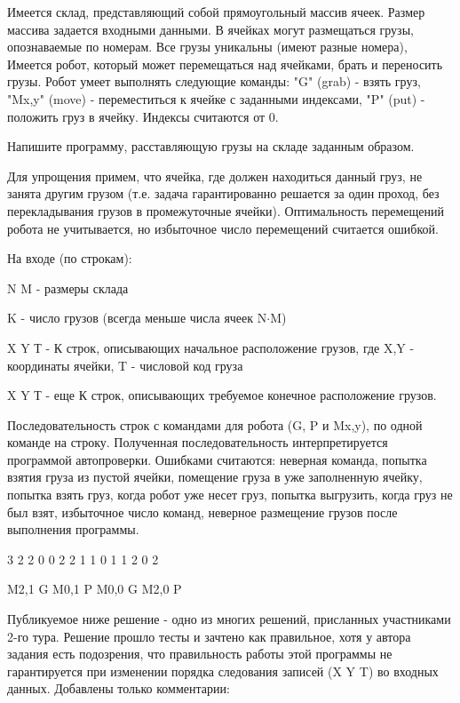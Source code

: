 
Имеется склад, представляющий собой прямоугольный массив ячеек. Размер массива задается входными данными. В ячейках могут размещаться грузы, опознаваемые по номерам. Все грузы уникальны (имеют разные номера), Имеется робот, который может перемещаться над ячейками, брать и переносить грузы. Робот умеет выполнять следующие команды:  "G" (grab) - взять груз, "Mx,y" (move) - переместиться к ячейке с заданными индексами, "P" (put) - положить груз в ячейку.  Индексы считаются от 0.

Напишите программу, расставляющую грузы на складе заданным образом.

Для упрощения примем, что ячейка, где должен находиться данный груз, не занята другим грузом (т.е. задача гарантированно решается за один проход, без перекладывания грузов в промежуточные ячейки). Оптимальность перемещений робота не учитывается, но избыточное число перемещений считается ошибкой.

На входе (по строкам):  

N M - размеры склада

K  - число грузов (всегда меньше числа ячеек N$\cdot$M)

X Y Т  - К строк, описывающих начальное расположение грузов, где X,Y - координаты ячейки, T - числовой код груза

X Y Т - еще К строк, описывающих требуемое конечное расположение грузов.

\outputfmtSection
Последовательность строк с командами для робота (G, P и Mx,y), по одной команде на строку. Полученная последовательность интерпретируется программой автопроверки. Ошибками считаются: неверная команда, попытка взятия груза из пустой ячейки, помещение груза в уже заполненную ячейку, попытка взять груз, когда робот уже несет груз, попытка выгрузить, когда груз не был взят, избыточное число команд, неверное размещение грузов после выполнения программы.

\begin{myverbbox}[\small]{\vinput}
    3 2
    2
    0 0 2
    2 1 1
    0 1 1
    2 0 2
\end{myverbbox}
\begin{myverbbox}[\small]{\voutput}
    M2,1
    G
    M0,1
    P
    M0,0
    G
    M2,0
    P
\end{myverbbox}

\solutionSection

Публикуемое ниже решение - одно из многих решений, присланных участниками 2-го тура.  Решение прошло тесты и зачтено как правильное, хотя у автора задания есть подозрения, что правильность работы этой программы не гарантируется при изменении порядка следования записей (X Y T) во входных данных. Добавлены только комментарии:

